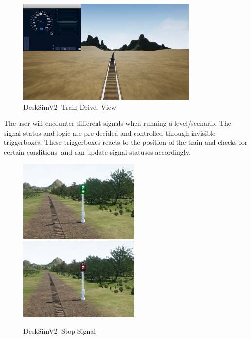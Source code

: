 \begin{figure}[H]
    \centering
    \vspace{12pt}
    \includegraphics[width=0.8\textwidth]{figures/Tog Drive.PNG}
    \caption{DeskSimV2: Train Driver View}
    \label{Train_Driver_View_img}
\end{figure}


The user will encounter different signals when running a level/scenario. The signal status and logic are pre-decided and controlled through invisible triggerboxes. These triggerboxes reacts to the position of the train and checks for certain conditions, and can update signal statuses accordingly. 

\begin{figure}[H]
    \centering

    \includegraphics[width=6cm]{figures/Signal1.png}
    \includegraphics[width=6cm]{figures/Signal2.png}
    \caption{DeskSimV2: Stop Signal}
    \label{Stop_Signal_img}
\end{figure} 


